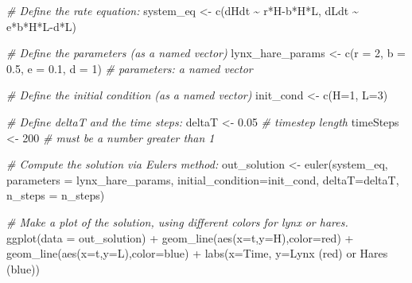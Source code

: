 \documentclass[
]{book}
\newenvironment{Shaded}{\begin{snugshade}}{\end{snugshade}}
\newcommand{\AttributeTok}[1]{\textcolor[rgb]{0.77,0.63,0.00}{#1}}
\newcommand{\CommentTok}[1]{\textcolor[rgb]{0.56,0.35,0.01}{\textit{#1}}}
\newcommand{\DecValTok}[1]{\textcolor[rgb]{0.00,0.00,0.81}{#1}}
\newcommand{\FloatTok}[1]{\textcolor[rgb]{0.00,0.00,0.81}{#1}}
\newcommand{\FunctionTok}[1]{\textcolor[rgb]{0.00,0.00,0.00}{#1}}
\newcommand{\NormalTok}[1]{#1}
\newcommand{\OtherTok}[1]{\textcolor[rgb]{0.56,0.35,0.01}{#1}}
\newcommand{\SpecialCharTok}[1]{\textcolor[rgb]{0.00,0.00,0.00}{#1}}
\newcommand{\StringTok}[1]{\textcolor[rgb]{0.31,0.60,0.02}{#1}}
\theoremstyle{definition}
\theoremstyle{definition}
\theoremstyle{definition}
\theoremstyle{remark}
\begin{document}
\begin{Shaded}
\begin{Highlighting}[]
\CommentTok{\# Define the rate equation:}
\NormalTok{system\_eq }\OtherTok{\textless{}{-}} \FunctionTok{c}\NormalTok{(dHdt }\SpecialCharTok{\textasciitilde{}}\NormalTok{ r}\SpecialCharTok{*}\NormalTok{H}\SpecialCharTok{{-}}\NormalTok{b}\SpecialCharTok{*}\NormalTok{H}\SpecialCharTok{*}\NormalTok{L,}
\NormalTok{               dLdt }\SpecialCharTok{\textasciitilde{}}\NormalTok{ e}\SpecialCharTok{*}\NormalTok{b}\SpecialCharTok{*}\NormalTok{H}\SpecialCharTok{*}\NormalTok{L}\SpecialCharTok{{-}}\NormalTok{d}\SpecialCharTok{*}\NormalTok{L)}


\CommentTok{\# Define the parameters (as a named vector)}
\NormalTok{lynx\_hare\_params }\OtherTok{\textless{}{-}} \FunctionTok{c}\NormalTok{(}\AttributeTok{r =} \DecValTok{2}\NormalTok{, }\AttributeTok{b =} \FloatTok{0.5}\NormalTok{, }\AttributeTok{e =} \FloatTok{0.1}\NormalTok{, }\AttributeTok{d =} \DecValTok{1}\NormalTok{)   }\CommentTok{\# parameters: a named vector}

\CommentTok{\# Define the initial condition (as a named vector)}
\NormalTok{init\_cond }\OtherTok{\textless{}{-}} \FunctionTok{c}\NormalTok{(}\AttributeTok{H=}\DecValTok{1}\NormalTok{, }\AttributeTok{L=}\DecValTok{3}\NormalTok{)}

\CommentTok{\# Define deltaT and the time steps:}
\NormalTok{deltaT }\OtherTok{\textless{}{-}} \FloatTok{0.05}    \CommentTok{\# timestep length}
\NormalTok{timeSteps }\OtherTok{\textless{}{-}} \DecValTok{200}   \CommentTok{\# must be a number greater than 1}

\CommentTok{\# Compute the solution via Euler\textquotesingle{}s method:}
\NormalTok{out\_solution }\OtherTok{\textless{}{-}} \FunctionTok{euler}\NormalTok{(system\_eq,}
                      \AttributeTok{parameters =}\NormalTok{ lynx\_hare\_params,}
                      \AttributeTok{initial\_condition=}\NormalTok{init\_cond,}
                      \AttributeTok{deltaT=}\NormalTok{deltaT,}
                      \AttributeTok{n\_steps =}\NormalTok{ n\_steps)}

\CommentTok{\# Make a plot of the solution, using different colors for lynx or hares.}
\FunctionTok{ggplot}\NormalTok{(}\AttributeTok{data =}\NormalTok{ out\_solution) }\SpecialCharTok{+}
  \FunctionTok{geom\_line}\NormalTok{(}\FunctionTok{aes}\NormalTok{(}\AttributeTok{x=}\NormalTok{t,}\AttributeTok{y=}\NormalTok{H),}\AttributeTok{color=}\StringTok{\textquotesingle{}red\textquotesingle{}}\NormalTok{) }\SpecialCharTok{+}
  \FunctionTok{geom\_line}\NormalTok{(}\FunctionTok{aes}\NormalTok{(}\AttributeTok{x=}\NormalTok{t,}\AttributeTok{y=}\NormalTok{L),}\AttributeTok{color=}\StringTok{\textquotesingle{}blue\textquotesingle{}}\NormalTok{) }\SpecialCharTok{+}
\FunctionTok{labs}\NormalTok{(}\AttributeTok{x=}\StringTok{\textquotesingle{}Time\textquotesingle{}}\NormalTok{,}
     \AttributeTok{y=}\StringTok{\textquotesingle{}Lynx (red) or Hares (blue)\textquotesingle{}}\NormalTok{)}
\end{Highlighting}
\end{Shaded}
\end{document}
